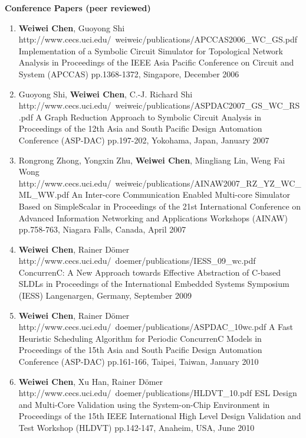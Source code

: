 \vspace{5mm}
{\textbf{\large Conference Papers (peer reviewed)}}
\vspace{-2mm}
\begin{enumerate}

\item
	\mypubhl
	{\textbf{Weiwei Chen}, Guoyong Shi}
	{http://www.cecs.uci.edu/~weiweic/publications/APCCAS2006_WC_GS.pdf}
	{Implementation of a Symbolic Circuit Simulator for Topological Network Analysis}
	{in Proceedings of }
	{the IEEE Asia Pacific Conference on Circuit and System (APCCAS)}
	{pp.1368-1372, Singapore, December 2006}
	
\item
	\mypubhl
	{Guoyong Shi, \textbf{Weiwei Chen}, C.-J. Richard Shi}
	{http://www.cecs.uci.edu/~weiweic/publications/ASPDAC2007_GS_WC_RS.pdf}
	{A Graph Reduction Approach to Symbolic Circuit Analysis}
	{in Proceedings of }
	{the 12th Asia and South Pacific Design Automation Conference (ASP-DAC)} 
	{pp.197-202, Yokohama, Japan, January 2007}

\item
	\mypubhl
	{Rongrong Zhong, Yongxin Zhu, \textbf{Weiwei Chen}, Mingliang Lin, Weng Fai Wong}
	{http://www.cecs.uci.edu/~weiweic/publications/AINAW2007_RZ_YZ_WC_ML_WW.pdf}
	{An Inter-core Communication Enabled Multi-core Simulator Based on SimpleScalar} 
	{in Proceedings of }
	{the 21st International Conference on Advanced Information Networking and Applications Workshops (AINAW)}
	{pp.758-763, Niagara Falls, Canada, April 2007}

\item
	\mypubhl
	{\textbf{Weiwei Chen}, Rainer D\"{o}mer}
	{http://www.cecs.uci.edu/~doemer/publications/IESS_09_wc.pdf} 
	{ConcurrenC: A New Approach towards Effective Abstraction of C-based SLDLs}
	{in Proceedings of }
	{the International Embedded Systems Symposium (IESS)}
	{Langenargen, Germany, September 2009}	
	
\item
	\mypubhl
	{\textbf{Weiwei Chen}, Rainer D\"{o}mer}
	{http://www.cecs.uci.edu/~doemer/publications/ASPDAC_10wc.pdf} 
	{A Fast Heuristic Scheduling Algorithm for Periodic ConcurrenC Models}
	{in Proceedings of }
	{the 15th Asia and South Pacific Design Automation Conference (ASP-DAC)}
	{pp.161-166, Taipei, Taiwan, January 2010}
	
\item
	\mypubhl
	{\textbf{Weiwei Chen}, Xu Han, Rainer D\"{o}mer}
	{http://www.cecs.uci.edu/~doemer/publications/HLDVT_10.pdf}
	{ESL Design and Multi-Core Validation using the System-on-Chip Environment}
	{in Proceedings of }
	{the 15th IEEE International High Level Design Validation and Test Workshop (HLDVT)}
	{pp.142-147, Anaheim, USA, June 2010}
	

\end{enumerate}
